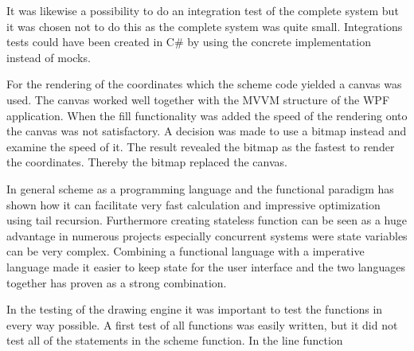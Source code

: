 It was likewise a possibility to do an integration test of the complete system but it was chosen not to do this as the complete system was quite small. Integrations tests could have been created in C\# by using the concrete implementation instead of mocks.

For the rendering of the coordinates which the scheme code yielded a canvas was used. The canvas worked well together with the MVVM structure of the WPF application. When the fill functionality was added the speed of the rendering onto the canvas was not satisfactory. A decision was made to use a bitmap instead and examine the speed of it. The result revealed the bitmap as the fastest to render the coordinates. Thereby the bitmap replaced the canvas. 

In general scheme as a programming language and the functional paradigm has shown how it can facilitate very fast calculation and impressive optimization using tail recursion. Furthermore creating stateless function can be seen as a huge advantage in numerous projects especially concurrent systems were state variables can be very complex. Combining a functional language with a imperative language made it easier to keep state for the user interface and the two languages together has proven as a strong combination.

In the testing of the drawing engine it was important to test the functions in every way possible. A first test of all functions was easily written, but it did not test all of the statements in the scheme function. In the line function